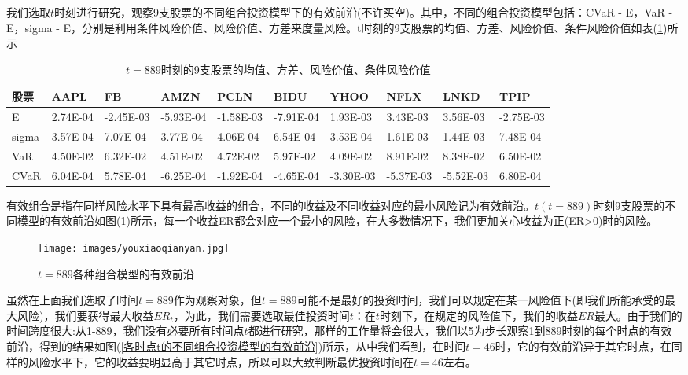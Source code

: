         \par
        我们选取$t$时刻进行研究，观察9支股票的不同组合投资模型下的有效前沿(不许买空)。其中，不同的组合投资模型包括：CVaR - E，VaR - E，sigma - E，分别是利用条件风险价值、风险价值、方差来度量风险。t时刻的9支股票的均值、方差、风险价值、条件风险价值如表(\ref{（t=889）时刻的9支股票的均值、方差、风险价值、条件风险价值})所示
        \begin{table}[H]
        \footnotesize
        \caption{$t=889$时刻的9支股票的均值、方差、风险价值、条件风险价值}
        \label{（t=889）时刻的9支股票的均值、方差、风险价值、条件风险价值}
        \centering
        \begin{tabular}{l|lllllllll}
            \toprule
        股票 & AAPL &   FB & AMZN  &  PCLN  &  BIDU  &  YHOO  &  NFLX  &  LNKD  &  TPIP\\
            \midrule
        E    &2.74E-04  &-2.45E-03& -5.93E-04 &-1.58E-03& -7.91E-04& 1.93E-03 & 3.43E-03 & 3.56E-03 &-2.75E-03\\
        sigma&3.57E-04  &7.07E-04 & 3.77E-04  &4.06E-04 & 6.54E-04 & 3.53E-04 & 1.61E-03 & 1.44E-03 & 7.48E-04\\
        VaR  &4.50E-02  &6.32E-02 & 4.51E-02  &4.72E-02 & 5.97E-02 & 4.09E-02 & 8.91E-02 & 8.38E-02 & 6.50E-02\\
        CVaR &6.04E-04  &5.78E-04 & -6.25E-04 &-1.92E-04& -4.65E-04& -3.30E-03& -5.37E-03& -5.52E-03& 6.80E-04\\
            \bottomrule
        \end{tabular}
        \end{table}
        \par
        有效组合是指在同样风险水平下具有最高收益的组合，不同的收益及不同收益对应的最小风险记为有效前沿。$t (t=889)$时刻9支股票的不同模型的有效前沿如图(\ref{各种组合模型的有效前沿})所示，每一个收益ER都会对应一个最小的风险，在大多数情况下，我们更加关心收益为正(ER>0)时的风险。
        \begin{figure}[H]
        \centering
        \texttt{[image: images/youxiaoqianyan.jpg]}
        \caption{$t=889$各种组合模型的有效前沿}
        \label{各种组合模型的有效前沿}
        \end{figure}
        \par
        虽然在上面我们选取了时间$t=889$作为观察对象，但$t=889$可能不是最好的投资时间，我们可以规定在某一风险值下(即我们所能承受的最大风险)，我们要获得最大收益$ER_t$，为此，我们需要选取最佳投资时间$t$：在$t$时刻下，在规定的风险值下，我们的收益$ER$最大。由于我们的时间跨度很大:从1-889，我们没有必要所有时间点$t$都进行研究，那样的工作量将会很大，我们以5为步长观察1到889时刻的每个时点的有效前沿，得到的结果如图(\ref{各时点t的不同组合投资模型的有效前沿})所示，从中我们看到，在时间$t=46$时，它的有效前沿异于其它时点，在同样的风险水平下，它的收益要明显高于其它时点，所以可以大致判断最优投资时间在$t=46$左右。
